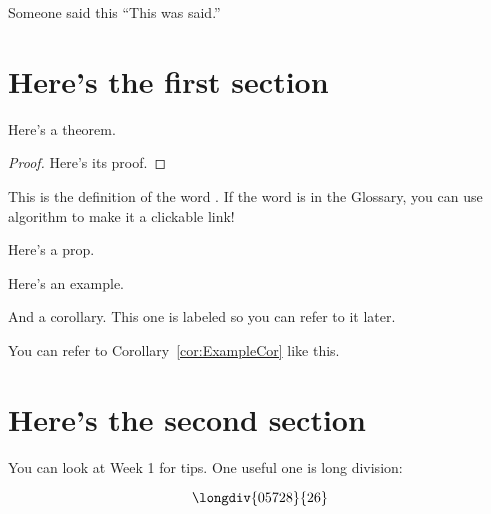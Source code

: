 \begin{chapquote}{Someone said this}
``This was said.''
\end{chapquote}

\section{Here's the first section}

\begin{theorem}
Here's a theorem.
\end{theorem}

\begin{proof}
Here's its proof.
\end{proof}

\begin{definition} This is the definition of the word .  If the word is in the Glossary, you can use \gls{algorithm} to make it a clickable link!
\end{definition}

\begin{proposition} Here's a prop.\end{proposition}

\begin{example} Here's an example. \end{example}

\begin{corollary}\label{cor:ExampleCor} And a corollary.  This one is labeled so you can refer to it later.\end{corollary}

You can refer to Corollary~\ref{cor:ExampleCor} like this.

\section{Here's the second section}
You can look at Week 1 for tips.  One useful one is long division:

\[
\longdiv{05728}{26}
\]